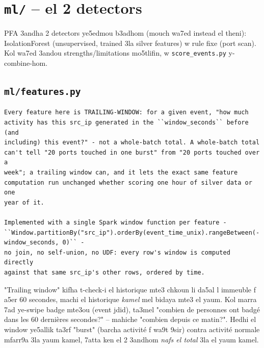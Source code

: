 \documentclass[11pt,a4paper]{report}
\DeclareRobustCommand{\code}[1]{\texttt{#1}}
\DeclareRobustCommand{\file}[1]{\texttt{\color{amber}#1}}
\begin{document}
\chapter{\file{ml/} -- el 2 detectors}

PFA 3andha 2 detectors ye5edmou b3adhom (mouch wa7ed instead el theni):
IsolationForest (unsupervised, trained 3la silver features) w rule fixe
(port scan). Kol wa7ed 3andou strengths/limitations mo5tlifin, w
\code{score\_events.py} y-combine-hom.

\section{\file{ml/features.py}}

\begin{lstlisting}[style=pystyle]
Every feature here is TRAILING-WINDOW: for a given event, "how much
activity has this src_ip generated in the ``window_seconds`` before (and
including) this event?" - not a whole-batch total. A whole-batch total
can't tell "20 ports touched in one burst" from "20 ports touched over a
week"; a trailing window can, and it lets the exact same feature
computation run unchanged whether scoring one hour of silver data or one
year of it.

Implemented with a single Spark window function per feature -
``Window.partitionBy("src_ip").orderBy(event_time_unix).rangeBetween(-window_seconds, 0)`` -
no join, no self-union, no UDF: every row's window is computed directly
against that same src_ip's other rows, ordered by time.
\end{lstlisting}

\begin{analogy}
"Trailing window" kifha t-check-i el historique mte3 chkoun li da5al
l immeuble f a5er 60 secondes, machi el historique \emph{kamel} mel bidaya
mte3 el yaum. Kol marra 7ad ye-swipe badge mte3ou (event jdid), ta3mel
"combien de personnes ont badgé dans les 60 dernières secondes?" -- mahiche
"combien depuis ce matin?". Hedhi el window ye5allik ta3rf "burst" (barcha
activité f wa9t 9sir) contra activité normale mfarr9a 3la yaum kamel,
7atta ken el 2 3andhom \emph{nafs el total} 3la el yaum kamel.
\end{analogy}
\end{document}

